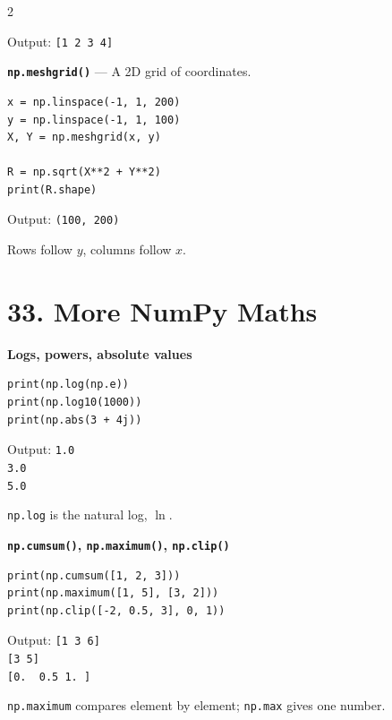 \documentclass[10pt,a4paper]{article}
\begin{document}
\begin{multicols}{2}
\begin{card}
Output:
\texttt{[1 2 3 4]}
\end{card}

\begin{card}
\textbf{\texttt{np.meshgrid()}} --- A 2D grid of coordinates.

\begin{lstlisting}[style=pythonstyle]
x = np.linspace(-1, 1, 200)
y = np.linspace(-1, 1, 100)
X, Y = np.meshgrid(x, y)

R = np.sqrt(X**2 + Y**2)
print(R.shape)
\end{lstlisting}

Output:
\texttt{(100, 200)}

Rows follow $y$, columns follow $x$.
\end{card}

\section*{33. More NumPy Maths}

\begin{card}
\textbf{Logs, powers, absolute values}

\begin{lstlisting}[style=pythonstyle]
print(np.log(np.e))
print(np.log10(1000))
print(np.abs(3 + 4j))
\end{lstlisting}

Output:
\texttt{1.0}\\
\texttt{3.0}\\
\texttt{5.0}

\texttt{np.log} is the natural log, $\ln$.
\end{card}

\begin{card}
\textbf{\texttt{np.cumsum()}, \texttt{np.maximum()}, \texttt{np.clip()}}

\begin{lstlisting}[style=pythonstyle]
print(np.cumsum([1, 2, 3]))
print(np.maximum([1, 5], [3, 2]))
print(np.clip([-2, 0.5, 3], 0, 1))
\end{lstlisting}

Output:
\texttt{[1 3 6]}\\
\texttt{[3 5]}\\
\texttt{[0.\ \ 0.5 1.\ ]}

\texttt{np.maximum} compares element by element; \texttt{np.max} gives one number.
\end{card}


\end{multicols}
\end{document}
